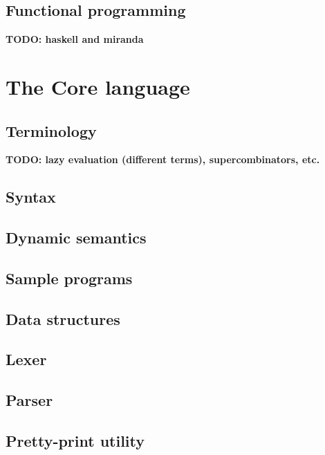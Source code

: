 \documentclass{article}
\newcommand{\todo}[1]{\textbf{TODO: #1}}
\begin{document}
\subsection{Functional programming}
\label{sec:fp}

\todo{haskell and miranda}

\section{The Core language}
\label{sec:core}

\subsection{Terminology}
\label{sec:terminology}

\todo{lazy evaluation (different terms), supercombinators, etc.}

\subsection{Syntax}
\label{sec:syntax}

\subsection{Dynamic semantics}
\label{sec:dynamic-semantics}

\subsection{Sample programs}
\label{sec:sample-programs}

\subsection{Data structures}
\label{sec:core-data-structures}

\subsection{Lexer}
\label{sec:lexer}

\subsection{Parser}
\label{sec:parser}

\subsection{Pretty-print utility}
\label{sec:pretty-print}
\end{document}
